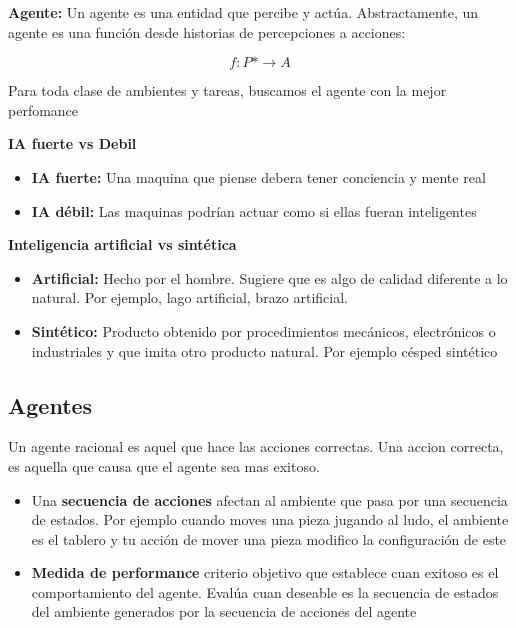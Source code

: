 \textbf{Agente: }Un agente es una entidad que percibe y actúa. Abstractamente, un agente es una función desde historias de percepciones a acciones:

\begin{equation}
  f: P* \rightarrow A 
\end{equation}

Para toda clase de ambientes y tareas, buscamos el agente con la mejor perfomance

\textbf{IA fuerte vs Debil }
\begin{itemize}
  \item \textbf{IA fuerte: }Una maquina que piense debera tener conciencia y mente real
  \item \textbf{IA débil: }Las maquinas podrían actuar como si ellas fueran inteligentes
\end{itemize}

\textbf{Inteligencia artificial vs sintética}
\begin{itemize}
  \item \textbf{Artificial: }Hecho por el hombre. Sugiere que es algo de calidad diferente a lo natural. Por ejemplo, lago artificial, brazo artificial.
  \item \textbf{Sintético: }Producto obtenido por procedimientos mecánicos, electrónicos o industriales y que imita otro producto natural. Por ejemplo césped sintético  
\end{itemize}

\subsection{Agentes}
Un agente racional es aquel que hace las acciones correctas. Una accion correcta, es aquella que causa que el agente sea mas exitoso.
\begin{itemize}
  \item Una \textbf{secuencia de acciones} afectan al ambiente que pasa por una secuencia de estados. Por ejemplo cuando moves una pieza jugando al ludo, el ambiente es el tablero y tu acción de mover una pieza modifico la configuración de este
  \item \textbf{Medida de performance} criterio objetivo que establece cuan exitoso es el comportamiento del agente. Evalúa cuan deseable es la secuencia de estados del ambiente generados por la secuencia de acciones del agente
\end{itemize}

